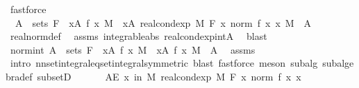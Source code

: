 \begin{isabellebody}
\ fastforce\isanewline
\ \ \isamarkupfalse%
\ {\isacharasterisk}{\kern0pt}{\isacharasterisk}{\kern0pt}{\isacharcolon}{\kern0pt}\ {\isachardoublequoteopen}A\ {\isasymin}\ sets\ F\ {\isasymLongrightarrow}\ {\isasymintegral}x{\isasymin}A{\isachardot}{\kern0pt}\ {\isasymbar}f\ x{\isasymbar}\ {\isasympartial}M\ {\isacharequal}{\kern0pt}\ {\isasymintegral}x{\isasymin}A{\isachardot}{\kern0pt}\ real{\isacharunderscore}{\kern0pt}cond{\isacharunderscore}{\kern0pt}exp\ M\ F\ {\isacharparenleft}{\kern0pt}{\isasymlambda}x{\isachardot}{\kern0pt}\ norm\ {\isacharparenleft}{\kern0pt}f\ x{\isacharparenright}{\kern0pt}{\isacharparenright}{\kern0pt}\ x\ {\isasympartial}M{\isachardoublequoteclose}\ \ A\ \isamarkupfalse%
\ real{\isacharunderscore}{\kern0pt}norm{\isacharunderscore}{\kern0pt}def\ \isamarkupfalse%
\ assms\ integrable{\isacharunderscore}{\kern0pt}abs\ real{\isacharunderscore}{\kern0pt}cond{\isacharunderscore}{\kern0pt}exp{\isacharunderscore}{\kern0pt}intA\ \isamarkupfalse%
\ blast\isanewline
\ \ \isanewline
\ \ \isamarkupfalse%
\ norm{\isacharunderscore}{\kern0pt}int{\isacharcolon}{\kern0pt}\ {\isachardoublequoteopen}A\ {\isasymin}\ sets\ F\ {\isasymLongrightarrow}\ {\isacharparenleft}{\kern0pt}{\isasymintegral}x{\isasymin}A{\isachardot}{\kern0pt}\ {\isasymbar}f\ x{\isasymbar}\ {\isasympartial}M{\isacharparenright}{\kern0pt}\ {\isacharequal}{\kern0pt}\ {\isacharparenleft}{\kern0pt}{\isasymintegral}\isactrlsup {\isacharplus}{\kern0pt}x{\isasymin}A{\isachardot}{\kern0pt}\ {\isasymbar}f\ x{\isasymbar}\ {\isasympartial}M{\isacharparenright}{\kern0pt}{\isachardoublequoteclose}\ \ A\ \isamarkupfalse%
\ assms\ \isamarkupfalse%
\ {\isacharparenleft}{\kern0pt}intro\ nn{\isacharunderscore}{\kern0pt}set{\isacharunderscore}{\kern0pt}integral{\isacharunderscore}{\kern0pt}eq{\isacharunderscore}{\kern0pt}set{\isacharunderscore}{\kern0pt}integral{\isacharbrackleft}{\kern0pt}symmetric{\isacharbrackright}{\kern0pt}{\isacharcomma}{\kern0pt}\ blast{\isacharcomma}{\kern0pt}\ fastforce{\isacharparenright}{\kern0pt}\ {\isacharparenleft}{\kern0pt}meson\ subalg\ subalgebra{\isacharunderscore}{\kern0pt}def\ subsetD{\isacharparenright}{\kern0pt}\isanewline
\ \ \isanewline
\ \ \isamarkupfalse%
\ {\isachardoublequoteopen}AE\ x\ in\ M{\isachardot}{\kern0pt}\ real{\isacharunderscore}{\kern0pt}cond{\isacharunderscore}{\kern0pt}exp\ M\ F\ {\isacharparenleft}{\kern0pt}{\isasymlambda}x{\isachardot}{\kern0pt}\ norm\ {\isacharparenleft}{\kern0pt}f\ x{\isacharparenright}{\kern0pt}{\isacharparenright}{\kern0pt}\ x\ {\isasymge}\ {}{\isachardoublequoteclose}\ \isamarkupfalse%

\end{isabellebody}
